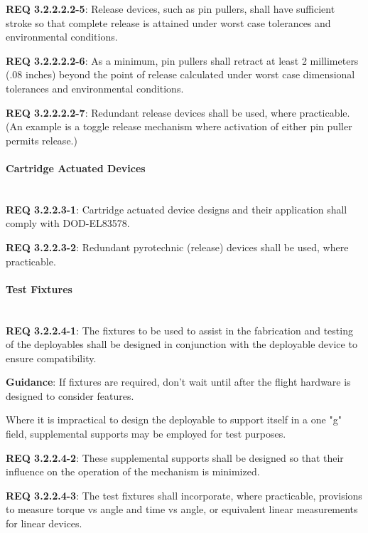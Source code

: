 \documentclass[12pt]{article}
\begin{document}
\noindent \textbf{REQ 3.2.2.2.2-5}: Release devices, such as pin pullers, shall have sufficient stroke so that complete release is attained under worst case tolerances and environmental conditions. 

\noindent \textbf{REQ 3.2.2.2.2-6}: As a minimum, pin pullers shall retract at least 2 millimeters (.08 inches) beyond the point of release calculated under worst case dimensional tolerances and environmental conditions. 

\noindent \textbf{REQ 3.2.2.2.2-7}: Redundant release devices shall be used, where practicable. 
(An example is a toggle release mechanism where activation of either pin puller permits release.)


\paragraph{Cartridge Actuated Devices} \mbox{} \\ %
\noindent \textbf{REQ 3.2.2.3-1}: Cartridge actuated device designs and their application shall comply with DOD-EL83578. 

\noindent \textbf{REQ 3.2.2.3-2}: Redundant pyrotechnic (release) devices shall be used, where practicable.


\paragraph{Test Fixtures} \mbox{} \\ %
\noindent \textbf{REQ 3.2.2.4-1}: The fixtures to be used to assist in the fabrication and testing of the deployables shall be designed in conjunction with the deployable device to ensure compatibility. 

\noindent \textbf{Guidance}: If fixtures are required, don't wait until after the flight hardware is designed to consider features.

Where it is impractical to design the deployable to support itself in a one "g" field, supplemental supports may be employed for test purposes. 

\noindent \textbf{REQ 3.2.2.4-2}: These supplemental supports shall be designed so that their influence on the operation of the mechanism is minimized. 

\noindent \textbf{REQ 3.2.2.4-3}: The test fixtures shall incorporate, where practicable, provisions to measure torque vs angle and time vs angle, or equivalent linear measurements for linear devices. 
\end{document}
